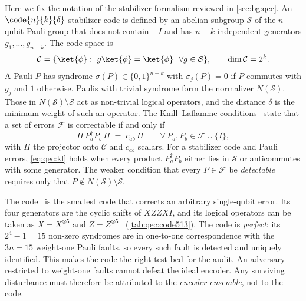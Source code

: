 Here we fix the notation of the stabilizer formalism reviewed in \cref{sec:bg:qec}. An $\code{n}{k}{\delta}$ stabilizer code is defined by an abelian subgroup $\mathcal{S}$ of the $n$-qubit Pauli group that does not contain $-I$ and has $n-k$ independent generators $g_1,\dots,g_{n-k}$. The code space is
\begin{equation}\label{eq:qec:codespace}
  \mathcal{C}=\{\ket{\phi}:\ g\ket{\phi}=\ket{\phi}\ \ \forall g\in\mathcal{S}\},\qquad \dim\mathcal{C}=2^{k}.
\end{equation}
A Pauli $P$ has syndrome $\sigma(P)\in\{0,1\}^{n-k}$ with $\sigma_j(P)=0$ if $P$ commutes with $g_j$ and $1$ otherwise. Paulis with trivial syndrome form the normalizer $N(\mathcal{S})$. Those in $N(\mathcal{S})\setminus\mathcal{S}$ act as non-trivial logical operators, and the distance $\delta$ is the minimum weight of such an operator. The Knill--Laflamme conditions~\cite{knill1997theory} state that a set of errors $\mathcal{F}$ is correctable if and only if
\begin{equation}\label{eq:qec:kl}
  \Pi\,P_a^{\dagger}P_b\,\Pi \;=\; c_{ab}\,\Pi\qquad\forall\,P_a,P_b\in\mathcal{F}\cup\{I\},
\end{equation}
with $\Pi$ the projector onto $\mathcal{C}$ and $c_{ab}$ scalars. For a stabilizer code and Pauli errors, \cref{eq:qec:kl} holds when every product $P_a^{\dagger}P_b$ either lies in $\mathcal{S}$ or anticommutes with some generator. The weaker condition that every $P\in\mathcal{F}$ be \emph{detectable} requires only that $P\notin N(\mathcal{S})\setminus\mathcal{S}$.

The  code~\cite{laflamme1996perfect,bennett1996mixed} is the smallest code that corrects an arbitrary single-qubit error. Its four generators are the cyclic shifts of $XZZXI$, and its logical operators can be taken as $\bar X=X^{\otimes 5}$ and $\bar Z=Z^{\otimes 5}$~\cite{nielsen2010qcqi} (\cref{tab:qec:code513}). The code is \emph{perfect}: its $2^{4}-1=15$ non-zero syndromes are in one-to-one correspondence with the $3n=15$ weight-one Pauli faults, so every such fault is detected and uniquely identified. This makes the code the right test bed for the audit. An adversary restricted to weight-one faults cannot defeat the ideal  encoder. Any surviving disturbance must therefore be attributed to the \emph{encoder ensemble}, not to the code.


